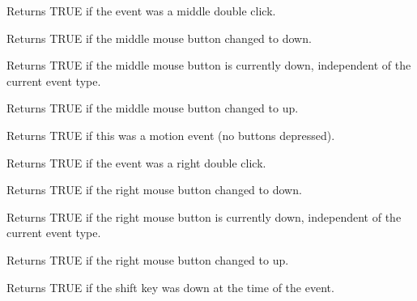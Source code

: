 

Returns TRUE if the event was a middle double click.



Returns TRUE if the middle mouse button changed to down.



Returns TRUE if the middle mouse button is currently down, independent
of the current event type.



Returns TRUE if the middle mouse button changed to up.



Returns TRUE if this was a motion event (no buttons depressed).



Returns TRUE if the event was a right double click.



Returns TRUE if the right mouse button changed to down.



Returns TRUE if the right mouse button is currently down, independent
of the current event type.



Returns TRUE if the right mouse button changed to up.



Returns TRUE if the shift key was down at the time of the event.

